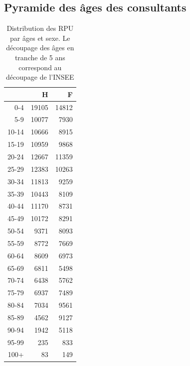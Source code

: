 \documentclass[12pt,english,french,twoside]{book}\usepackage[]{graphicx}\usepackage[]{color}
\begin{document}
\subsection*{Pyramide des âges des consultants}

\begin{table}[ht]
\centering
\begin{tabular}{rrr}
  \hline
 & H & F \\ 
  \hline
0-4 & 19105 & 14812 \\ 
  5-9 & 10077 & 7930 \\ 
  10-14 & 10666 & 8915 \\ 
  15-19 & 10959 & 9868 \\ 
  20-24 & 12667 & 11359 \\ 
  25-29 & 12383 & 10263 \\ 
  30-34 & 11813 & 9259 \\ 
  35-39 & 10443 & 8109 \\ 
  40-44 & 11170 & 8731 \\ 
  45-49 & 10172 & 8291 \\ 
  50-54 & 9371 & 8093 \\ 
  55-59 & 8772 & 7669 \\ 
  60-64 & 8609 & 6973 \\ 
  65-69 & 6811 & 5498 \\ 
  70-74 & 6438 & 5762 \\ 
  75-79 & 6937 & 7489 \\ 
  80-84 & 7034 & 9561 \\ 
  85-89 & 4562 & 9127 \\ 
  90-94 & 1942 & 5118 \\ 
  95-99 & 235 & 833 \\ 
  100+ &  83 & 149 \\ 
   \hline
\end{tabular}
\caption[Répartition par âges et sexe]{Distribution des RPU par âges et sexe. Le découpage des âges en tranche de 5 ans correspond au découpage de l'INSEE} 
\label{tab:age_sexe}
\end{table}



\end{document}
